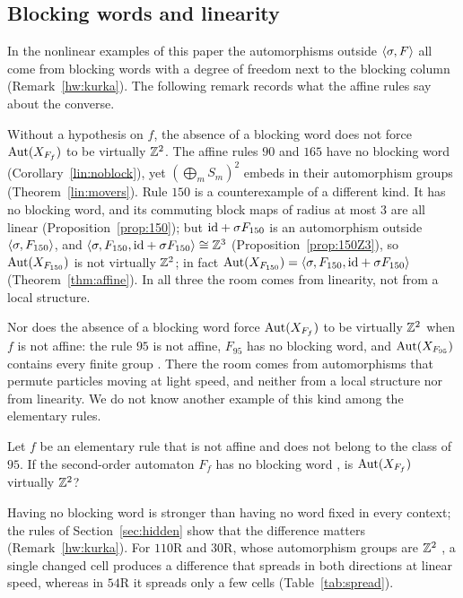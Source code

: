 \subsection*{Blocking words and linearity}
In the nonlinear examples of this paper the automorphisms outside $\langle\sigma,F\rangle$ all come from blocking words with a degree of freedom next to the blocking column (Remark~\ref{hw:kurka}). The following remark records what the affine rules say about the converse.

\begin{remark}\label{rem:dichotomy}
Without a hypothesis on $f$, the absence of a blocking word does not force $\operatorname{Aut}(X_{F_f})$ to be virtually $\mathbb{Z}^2$. The affine rules $90$ and $165$ have no blocking word (Corollary~\ref{lin:noblock}), yet $(\bigoplus_mS_m)^2$ embeds in their automorphism groups (Theorem~\ref{lin:movers}). Rule $150$ is a counterexample of a different kind. It has no blocking word, and its commuting block maps of radius at most $3$ are all linear (Proposition~\ref{prop:150}); but $\mathrm{id}+\sigma F_{150}$ is an automorphism outside $\langle\sigma,F_{150}\rangle$, and $\langle\sigma,F_{150},\mathrm{id}+\sigma F_{150}\rangle\cong\mathbb{Z}^3$ (Proposition~\ref{prop:150Z3}), so $\operatorname{Aut}(X_{F_{150}})$ is not virtually $\mathbb{Z}^2$; in fact $\operatorname{Aut}(X_{F_{150}})=\langle\sigma,F_{150},\mathrm{id}+\sigma F_{150}\rangle$ (Theorem~\ref{thm:affine}). In all three the room comes from linearity, not from a local structure.
\end{remark}

Nor does the absence of a blocking word force $\operatorname{Aut}(X_{F_f})$ to be virtually $\mathbb{Z}^2$ when $f$ is not affine: the rule $95$ is not affine, $F_{95}$ has no blocking word, and $\operatorname{Aut}(X_{F_{95}})$ contains every finite group \cite{PaperE}. There the room comes from automorphisms that permute particles moving at light speed, and neither from a local structure nor from linearity. We do not know another example of this kind among the elementary rules.

\begin{question}\label{q:dichotomy}
Let $f$ be an elementary rule that is not affine and does not belong to the class of $95$. If the second-order automaton $F_f$ has no blocking word \cite{Kurka1997,BT2000}, is $\operatorname{Aut}(X_{F_{f}})$ virtually $\mathbb{Z}^2$?
\end{question}

Having no blocking word is stronger than having no word fixed in every context; the rules of Section~\ref{sec:hidden} show that the difference matters (Remark~\ref{hw:kurka}). For $110$R and $30$R, whose automorphism groups are $\mathbb{Z}^2$ \cite{PaperA,PaperB}, a single changed cell produces a difference that spreads in both directions at linear speed, whereas in $54$R it spreads only a few cells (Table~\ref{tab:spread}).

